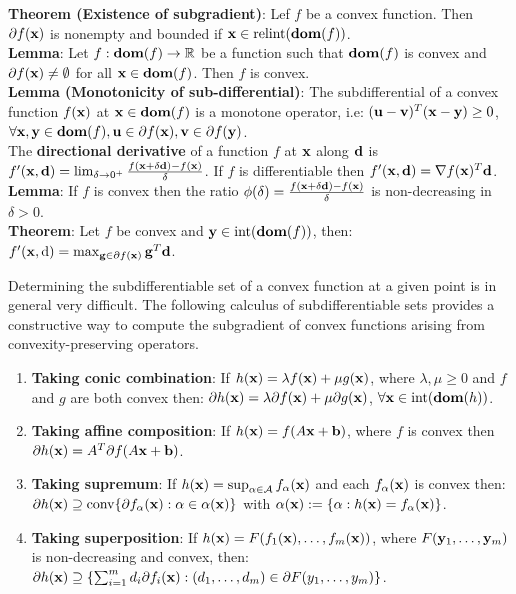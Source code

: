 \textbf{Theorem (Existence of subgradient)}: Lef $f$ be a convex function. Then $\partial f(\mathbf{x})$ is nonempty and bounded if $\mathbf{x} \in \mathrm{relint}(\textbf{dom}(f))$. \\
\textbf{Lemma}: Let $f : \textbf{dom}(f) \rightarrow \mathbb{R}$ be a function such that $\textbf{dom}(f)$ is convex and $\partial f(\mathbf{x}) \neq \emptyset$ for all $\mathbf{x} \in \textbf{dom}(f)$. Then $f$ is convex. \\
\textbf{Lemma (Monotonicity of sub-differential)}: The subdifferential of a convex function $f(\mathbf{x})$ at $\mathbf{x} \in \textbf{dom}(f)$ is a monotone operator, i.e: $(\mathbf{u} - \mathbf{v})^T (\mathbf{x} - \mathbf{y}) \geq 0$, $\forall \mathbf{x}, \mathbf{y} \in \textbf{dom}(f), \mathbf{u} \in \partial f(\mathbf{x}), \mathbf{v} \in \partial f(\mathbf{y})$. \\
The \textbf{directional derivative} of a function $f$ at $\mathbf{x}$ along $\mathbf{d}$ is $f'(\mathbf{x}, \mathbf{d}) = \lim_{\delta \rightarrow 0^{+}}{\frac{f(\mathbf{x} + \delta \mathbf{d}) - f(\mathbf{x})} {\delta}}$. If $f$ is differentiable then $f'(\mathbf{x}, \mathbf{d}) = \nabla f(\mathbf{x})^T \mathbf{d}$. \\
\textbf{Lemma}: If $f$ is convex then the ratio $\phi(\delta) = \frac{f(\mathbf{x} + \delta \mathbf{d}) - f(\mathbf{x})} {\delta}$ is non-decreasing in $\delta > 0$. \\
\textbf{Theorem}: Let $f$ be convex and $\mathbf{y} \in \mathrm{int}(\textbf{dom}(f))$, then: $f'(\mathbf{x}, \dd) = \max_{\mathbf{g} \in \partial f(\mathbf{x})}{\mathbf{g}^T \mathbf{d}}$. \\
\begin{framed}
    Determining the subdifferentiable set of a convex function at a given point is in general very difficult. The following calculus of subdifferentiable sets provides a constructive way to compute the subgradient of convex functions arising from convexity-preserving operators.
    \begin{enumerate}[label=(\roman*), topsep=0pt,itemsep=0ex,partopsep=0ex,parsep=0ex]   
        \itemsep0em
        \item \textbf{Taking conic combination}: If $h(\mathbf{x}) = \lambda f(\mathbf{x}) + \mu g(\mathbf{x})$, where $\lambda, \mu \geq 0$ and $f$ and $g$ are both convex then: $\partial h(\mathbf{x}) = \lambda \partial f(\mathbf{x}) + \mu \partial g(\mathbf{x})$, $\forall \mathbf{x} \in \mathrm{int}(\textbf{dom}(h))$. 
        \item \textbf{Taking affine composition}: If $h(\mathbf{x}) = f(A\mathbf{x} + \mathbf{b})$, where $f$ is convex then $\partial h(\mathbf{x}) = A^T \partial f(A\mathbf{x} +\mathbf{b})$. 
        \item \textbf{Taking supremum}: If $h(\mathbf{x}) = \sup_{\alpha \in \mathcal{A}}{f_{\alpha}(\mathbf{x})}$ and each $f_{\alpha}(\mathbf{x})$ is convex then: $\partial h(\mathbf{x}) \supseteq \mathrm{conv} \{ \partial f_{\alpha}(\mathbf{x}) : \alpha \in \alpha(\mathbf{x})\}$ with $\alpha(\mathbf{x}) := \{ \alpha : h(\mathbf{x}) = f_{\alpha}(\mathbf{x})\}$. 
        \item \textbf{Taking superposition}: If $h(\mathbf{x}) = F(f_1(\mathbf{x}), \dots, f_m(\mathbf{x}))$, where $F(\mathbf{y}_1, \dots, \mathbf{y}_m)$ is non-decreasing and convex, then: $\partial h(\mathbf{x}) \supseteq \left\{ \sum_{i=1}^m{d_i \partial f_i(\mathbf{x})} : (d_1, \dots, d_m) \in \partial F(y_1, \dots, y_m) \right\}$.
    \end{enumerate}
\end{framed}
